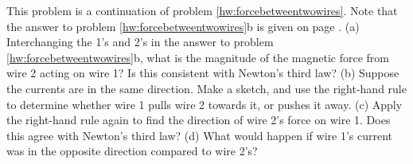         This problem is a continuation of problem \ref{hw:forcebetweentwowires}. Note that the
        answer to problem \ref{hw:forcebetweentwowires}b is given on page \pageref{hwans:forcebetweentwowires}.\hwendpart
        (a) Interchanging the 1's and 2's in the answer to problem \ref{hw:forcebetweentwowires}b,
        what is the magnitude of the magnetic force from wire 2 acting on wire 1? Is this consistent with
        Newton's third law?\hwendpart
        (b) Suppose the currents are in the same direction. Make a sketch, and use the
        right-hand rule to determine whether wire 1 pulls wire 2 towards it, or pushes it
        away.\hwendpart
        (c) Apply the right-hand rule again to find the direction of wire 2's force on
        wire 1. Does this agree with Newton's third law?\hwendpart
        (d) What would happen if wire 1's current was in the opposite direction compared
        to wire 2's?

